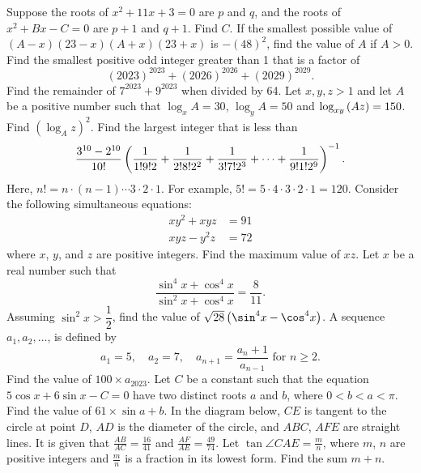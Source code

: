 \begin{enumerate}
    \setcounter{enumi}{5}
    \hyperrefitem[Q::2023-S-1-6] Suppose the roots of $x^2 + 11x + 3 = 0$ are $p$ and $q$, and the roots of $x^2 + Bx - C = 0$ are $p+1$ and $q+1$. Find $C$.
    \hyperrefitem[Q::2023-S-1-7] If the smallest possible value of $(A-x)(23-x)(A+x)(23+x)$ is $-(48)^2$, find the value of $A$ if $A > 0$.
    \hyperrefitem[Q::2023-S-1-8] Find the smallest positive odd integer greater than 1 that is a factor of \[(2023)^{2023} + (2026)^{2026} + (2029)^{2029}.\]
    \hyperrefitem[Q::2023-S-1-9] Find the remainder of $7^{2023} + 9^{2023}$ when divided by 64.
    \hyperrefitem[Q::2023-S-1-10] Let $x, y, z > 1$ and let $A$ be a positive number such that $\log_x A = 30$, $\log_y A = 50$ and $\log_{xy}\left( Az \right) = 150$. Find $(\log_A z)^2$.
    \hyperrefitem[Q::2023-S-1-11] Find the largest integer that is less than \[\frac{3^{10} - 2^{10}}{10!} \left( \frac1{1! 9! 2} + \frac1{2! 8! 2^2} + \frac1{3! 7! 2^3} + \cdots + \frac1{9! 1! 2^9} \right)^{-1}.\] Here, $n! = n \cdot (n-1) \cdots 3 \cdot 2 \cdot 1$. For example, $5! = 5 \cdot 4 \cdot 3 \cdot 2 \cdot 1 = 120$.
    \hyperrefitem[Q::2023-S-1-12] Consider the following simultaneous equations:
    \begin{align*}
        xy^2 + xyz &= 91\\
        xyz - y^2z &= 72
    \end{align*}
    where $x$, $y$, and $z$ are positive integers. Find the maximum value of $xz$.
    \hyperrefitem[Q::2023-S-1-13] Let $x$ be a real number such that \[\frac{\sin^4 x + \cos^4 x}{\sin^2 x + \cos^4 x} = \frac8{11}.\] Assuming $\sin^2 x > \dfrac12$, find the value of $\sqrt{28} \bp{\sin^4 x - \cos^4 x}$.
    \hyperrefitem[Q::2023-S-1-14] A sequence $a_1, a_2, \ldots$, is defined by \[a_1 = 5, \quad a_2 = 7, \quad a_{n+1} = \frac{a_n + 1}{a_{n-1}} \text{ for $n \geq 2$}.\] Find the value of $100 \times a_{2023}$.
    \hyperrefitem[Q::2023-S-1-15] Let $C$ be a constant such that the equation $5\cos x + 6 \sin x - C = 0$ have two distinct roots $a$ and $b$, where $0 < b < a < \pi$. Find the value of $61 \times \sin{a + b}$.
    \hyperrefitem[Q::2023-S-1-16] In the diagram below, $CE$ is tangent to the circle at point $D$, $AD$ is the diameter of the circle, and $ABC$, $AFE$ are straight lines. It is given that $\frac{AB}{AC} = \frac{16}{41}$ and $\frac{AF}{AE} = \frac{49}{74}$. Let $\tan{\angle CAE} = \frac{m}{n}$, where $m$, $n$ are positive integers and $\frac{m}{n}$ is a fraction in its lowest form. Find the sum $m + n$.


\end{enumerate}
